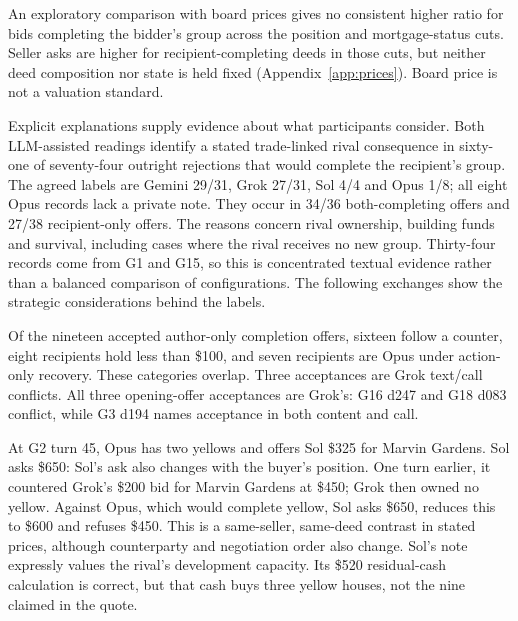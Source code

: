 An exploratory comparison with board prices gives no consistent higher ratio for bids completing the bidder's group across the position and mortgage-status cuts. Seller asks are higher for recipient-completing deeds in those cuts, but neither deed composition nor state is held fixed (Appendix~\ref{app:prices}). Board price is not a valuation standard.

Explicit explanations supply evidence about what participants consider. Both LLM-assisted readings identify a stated trade-linked rival consequence in sixty-one of seventy-four outright rejections that would complete the recipient's group. The agreed labels are Gemini 29/31, Grok 27/31, Sol 4/4 and Opus 1/8; all eight Opus records lack a private note. They occur in 34/36 both-completing offers and 27/38 recipient-only offers. The reasons concern rival ownership, building funds and survival, including cases where the rival receives no new group. Thirty-four records come from G1 and G15, so this is concentrated textual evidence rather than a balanced comparison of configurations. The following exchanges show the strategic considerations behind the labels.

Of the nineteen accepted author-only completion offers, sixteen follow a counter, eight recipients hold less than \$100, and seven recipients are Opus under action-only recovery. These categories overlap. Three acceptances are Grok text/call conflicts. All three opening-offer acceptances are Grok's: G16 d247 and G18 d083 conflict, while G3 d194 names acceptance in both content and call.


At G2 turn 45, Opus has two yellows and offers Sol \$325 for Marvin Gardens. Sol asks \$650:
Sol's ask also changes with the buyer's position. One turn earlier, it countered Grok's \$200 bid for Marvin Gardens at \$450; Grok then owned no yellow. Against Opus, which would complete yellow, Sol asks \$650, reduces this to \$600 and refuses \$450. This is a same-seller, same-deed contrast in stated prices, although counterparty and negotiation order also change. Sol's note expressly values the rival's development capacity. Its \$520 residual-cash calculation is correct, but that cash buys three yellow houses, not the nine claimed in the quote.

